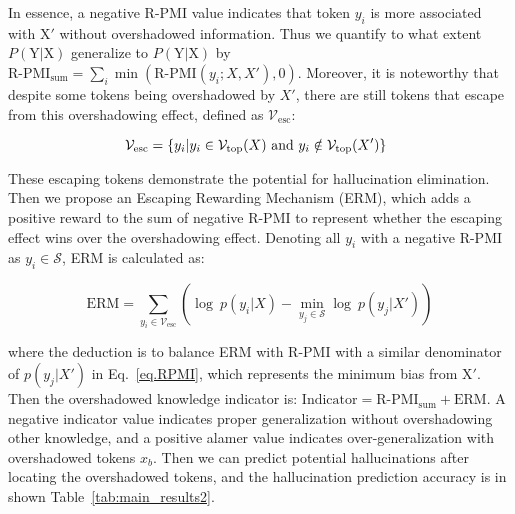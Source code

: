 \noindent In essence, a negative R-PMI value indicates that token \(y_i\) is more associated with $\text{X}'$ without overshadowed information.
Thus we quantify to what extent $P(\text{Y}|\text{X})$ generalize to $P(\text{Y}|\text{X})$ by $\text{R-PMI}_{\text{sum}} = \sum_{i} \min(\text{R-PMI}(y_i; X, X'), 0)$.
Moreover, it is noteworthy that despite some tokens being overshadowed by $X'$, there are still tokens that escape from this overshadowing effect, defined as $\mathcal{V}_{\text{esc}}$:

\begin{small}
\begin{equation}
\hspace{-2mm}
    \mathcal{V}_{\text{esc}} = \{ y_i | y_i \in \mathcal{V}_{\text{top}}(X) \ \text{and} \ y_i \notin \mathcal{V}_{\text{top}}(X') \}
\end{equation}
\end{small}

\noindent These escaping tokens demonstrate the potential for hallucination elimination.
Then we propose an Escaping Rewarding Mechanism (ERM), which adds a positive reward to the sum of negative $\text{R-PMI}$ to represent whether the escaping effect wins over the overshadowing effect. Denoting all $y_i$ with a negative R-PMI as $y_i\in\mathcal{S}$,  ERM is calculated as:

\vspace{-1em}
\begin{small}
\begin{equation}
    \text{ERM} = \sum_{y_i \in \mathcal{V}_{\text{esc}}} \left( \log~p(y_i|X) - \min_{y_j \in \mathcal{S}} \log~p(y_j|X') \right)
\label{eq:erm}
\end{equation}
\end{small}

\noindent where the deduction is to balance ERM with R-PMI with a similar denominator of $p(y_j|X')$ in Eq.~\ref{eq.RPMI}, which represents the minimum bias from $\text{X}'$. Then the overshadowed knowledge indicator is: {$\text{Indicator} = \text{R-PMI}_{\text{sum}} +  \text{ERM}$}. A negative indicator value indicates proper generalization without overshadowing other knowledge, and a positive alamer value indicates over-generalization with overshadowed tokens $x_b$. 
Then we can predict potential hallucinations after locating the overshadowed tokens, and the hallucination prediction accuracy is in shown Table~\ref{tab:main_results2}.


